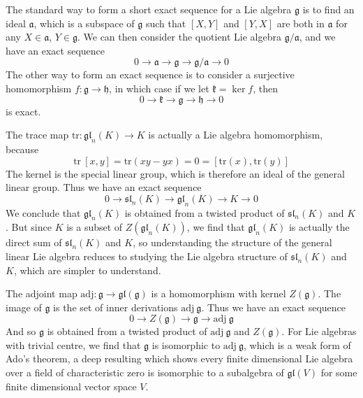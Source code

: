 The standard way to form a short exact sequence for a Lie algebra $\mathfrak{g}$ is to find an ideal $\mathfrak{a}$, which is a subspace of $\mathfrak{g}$ such that $[X,Y]$ and $[Y,X]$ are both in $\mathfrak{a}$ for any $X \in \mathfrak{a}$, $Y \in \mathfrak{g}$. We can then consider the quotient Lie algebra $\mathfrak{g}/\mathfrak{a}$, and we have an exact sequence
%
\[ 0 \to \mathfrak{a} \to \mathfrak{g} \to \mathfrak{g}/\mathfrak{a} \to 0 \]
%
The other way to form an exact sequence is to consider a surjective homomorphism $f: \mathfrak{g} \to \mathfrak{h}$, in which case if we let $\mathfrak{k} = \ker f$, then
%
\[ 0 \to \mathfrak{k} \to \mathfrak{g} \to \mathfrak{h} \to 0 \]
%
is exact.

\begin{example}
    The trace map $\text{tr}: \mathfrak{gl}_n(K) \to K$ is actually a Lie algebra homomorphism, because
    \[ \text{tr}\ [x,y] = \text{tr}(xy - yx) = 0 = [\text{tr}(x), \text{tr}(y)] \]
    The kernel is the special linear group, which is therefore an ideal of the general linear group. Thus we have an exact sequence
    \[ 0 \to \mathfrak{sl}_n(K) \to \mathfrak{gl}_n(K) \to K \to 0 \]
    We conclude that $\mathfrak{gl}_n(K)$ is obtained from a twisted product of $\mathfrak{sl}_n(K)$ and $K$. But since $K$ is a subset of $Z(\mathfrak{gl}_n(K))$, we find that $\mathfrak{gl}_n(K)$ is actually the direct sum of $\mathfrak{sl}_n(K)$ and $K$, so understanding the structure of the general linear Lie algebra reduces to studying the Lie algebra structure of $\mathfrak{sl}_n(K)$ and $K$, which are simpler to understand.
\end{example}

\begin{example}
    The adjoint map $\text{adj}: \mathfrak{g} \to \mathfrak{gl}(\mathfrak{g})$ is a homomorphism with kernel $Z(\mathfrak{g})$. The image of $\mathfrak{g}$ is the set of inner derivations $\text{adj}\ \mathfrak{g}$. Thus we have an exact sequence
    \[ 0 \to Z(\mathfrak{g}) \to \mathfrak{g} \to \text{adj}\ \mathfrak{g} \]
    And so $\mathfrak{g}$ is obtained from a twisted product of $\text{adj}\ \mathfrak{g}$ and $Z(\mathfrak{g})$. For Lie algebras with trivial centre, we find that $\mathfrak{g}$ is isomorphic to $\text{adj}\ \mathfrak{g}$, which is a weak form of Ado's theorem, a deep resulting which shows every finite dimensional Lie algebra over a field of characteristic zero is isomorphic to a subalgebra of $\mathfrak{gl}(V)$ for some finite dimensional vector space $V$.
\end{example}

